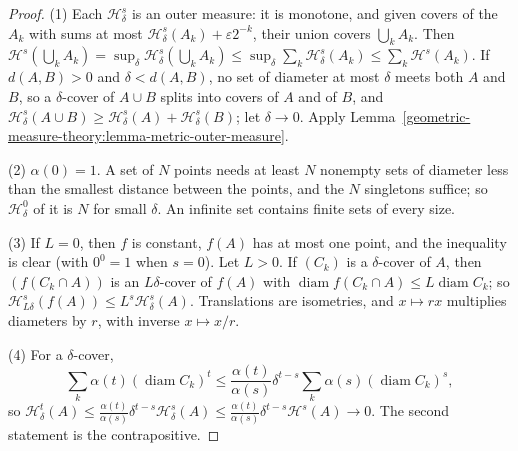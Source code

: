 \begin{proof}
(1) Each $\mathcal{H}^s_\delta$ is an outer measure: it is monotone, and given covers of the $A_k$ with sums at most $\mathcal{H}^s_\delta(A_k) + \varepsilon2^{-k}$, their union covers
$\bigcup_kA_k$. Then $\mathcal{H}^s(\bigcup_kA_k) = \sup_\delta\mathcal{H}^s_\delta(\bigcup_kA_k) \leq \sup_\delta\sum_k\mathcal{H}^s_\delta(A_k) \leq \sum_k\mathcal{H}^s(A_k)$. If
$d(A, B) > 0$ and $\delta < d(A, B)$, no set of diameter at most $\delta$ meets both $A$ and $B$, so a $\delta$-cover of $A \cup B$ splits into covers of $A$ and of $B$, and
$\mathcal{H}^s_\delta(A \cup B) \geq \mathcal{H}^s_\delta(A) + \mathcal{H}^s_\delta(B)$; let $\delta \to 0$. Apply Lemma~\ref{geometric-measure-theory:lemma-metric-outer-measure}.

(2) $\alpha(0) = 1$. A set of $N$ points needs at least $N$ nonempty sets of diameter less than the smallest distance between the points, and the $N$ singletons suffice; so
$\mathcal{H}^0_\delta$ of it is $N$ for small $\delta$. An infinite set contains finite sets of every size.

(3) If $L = 0$, then $f$ is constant, $f(A)$ has at most one point, and the inequality is clear (with $0^0 = 1$ when $s = 0$). Let $L > 0$. If $(C_k)$ is a
$\delta$-cover of $A$, then $(f(C_k \cap A))$ is an $L\delta$-cover of $f(A)$ with $\operatorname{diam}f(C_k \cap A) \leq L\operatorname{diam}C_k$; so
$\mathcal{H}^s_{L\delta}(f(A)) \leq L^s\mathcal{H}^s_\delta(A)$. Translations are isometries, and $x \mapsto rx$ multiplies diameters by $r$, with inverse $x \mapsto x/r$.

(4) For a $\delta$-cover,
\[
\sum_k\alpha(t)(\operatorname{diam}C_k)^t \leq \frac{\alpha(t)}{\alpha(s)}\delta^{t-s}\sum_k\alpha(s)(\operatorname{diam}C_k)^s,
\]
so $\mathcal{H}^t_\delta(A) \leq \frac{\alpha(t)}{\alpha(s)}\delta^{t-s}\mathcal{H}^s_\delta(A) \leq \frac{\alpha(t)}{\alpha(s)}\delta^{t-s}\mathcal{H}^s(A) \to 0$. The second statement is the
contrapositive.
\end{proof}

